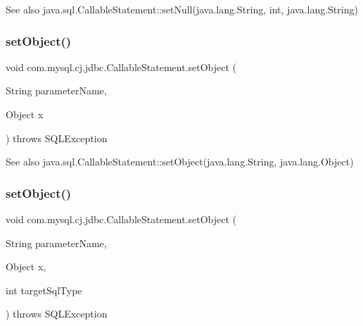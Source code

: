 \begin{DoxySeeAlso}{See also}
java.\+sql.\+Callable\+Statement\+::set\+Null(java.\+lang.\+String, int, java.\+lang.\+String) 
\end{DoxySeeAlso}
\mbox{\label{classcom_1_1mysql_1_1cj_1_1jdbc_1_1_callable_statement_a2a37988196c65bd7d26890a1fe33281b}} 
\subsubsection{\texorpdfstring{set\+Object()}{setObject()}\hspace{0.1cm}{\footnotesize\ttfamily [1/5]}}
{\footnotesize\ttfamily void com.\+mysql.\+cj.\+jdbc.\+Callable\+Statement.\+set\+Object (\begin{DoxyParamCaption}\item[{String}]{parameter\+Name,  }\item[{Object}]{x }\end{DoxyParamCaption}) throws S\+Q\+L\+Exception}

\begin{DoxySeeAlso}{See also}
java.\+sql.\+Callable\+Statement\+::set\+Object(java.\+lang.\+String, java.\+lang.\+Object) 
\end{DoxySeeAlso}
\mbox{\label{classcom_1_1mysql_1_1cj_1_1jdbc_1_1_callable_statement_a43a0be416f90c7c642fc33122bbccfb1}} 
\subsubsection{\texorpdfstring{set\+Object()}{setObject()}\hspace{0.1cm}{\footnotesize\ttfamily [2/5]}}
{\footnotesize\ttfamily void com.\+mysql.\+cj.\+jdbc.\+Callable\+Statement.\+set\+Object (\begin{DoxyParamCaption}\item[{String}]{parameter\+Name,  }\item[{Object}]{x,  }\item[{int}]{target\+Sql\+Type }\end{DoxyParamCaption}) throws S\+Q\+L\+Exception}

